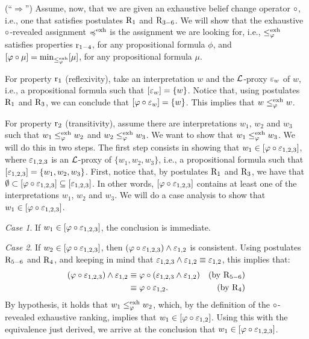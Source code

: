 \begin{prf*}{}{}
	(``$\Rightarrow$'')
	Assume, now, that we are given an exhaustive belief change operator $\circ$, 
	i.e., one that satisfies postulates $\mathrm{R}_{1}$ and $\mathrm{R}_{3-6}$.
	We will show that the exhaustive $\circ$-revealed assignment $\preccurlyeq^{\operatorname{exh}}$ 
	is the assignment we are looking for,
	i.e., $\le^{\operatorname{exh}}_\varphi$ satisfies properties $\mathrm{r}_{1-4}$, for any propositional formula $\phi$,
	and $[\varphi\circ\mu]={\operatorname{min}}_{\le^{\operatorname{exh}}_\varphi}[\mu]$, for any propositional formula $\mu$.
	
	For property $\mathrm{r}_{1}$ (reflexivity), take an interpretation $w$ and 
	the $\mathcal{L}$-proxy $\varepsilon_w$ of $w$, i.e., a propositional formula such that $[\varepsilon_w]=\{w\}$.
	Notice that, using postulates $\mathrm{R}_{1}$ and $\mathrm{R}_{3}$, we can conclude that 
	$[\varphi\circ\varepsilon_w]=\{w\}$. This implies that $w\le^{\operatorname{exh}}_\varphi w$.
	
	For property $\mathrm{r}_{2}$ (transitivity), assume there are interpretations $w_1$, $w_2$
	and $w_3$ such that $w_1\le^{\operatorname{exh}}_\varphi w_2$ and $w_2\le^{\operatorname{exh}}_\varphi w_3$. We want to show that $w_1\le^{\operatorname{exh}}_\varphi w_3$.
	We will do this in two steps. 
	The first step consists in showing that $w_1\in[\varphi\circ\varepsilon_{1,2,3}]$,
	where $\varepsilon_{1,2,3}$ is an $\mathcal{L}$-proxy of $\{w_1,w_2,w_3\}$,
	i.e., a propositional formula such that $[\varepsilon_{1,2,3}]=\{w_1,w_2,w_3\}$. 
	First, notice that, by postulates $\mathrm{R}_{1}$ and $\mathrm{R}_{3}$, we have that 
	$\emptyset\subset[\varphi\circ\varepsilon_{1,2,3}]\subseteq[\varepsilon_{1,2,3}]$.
	In other words, $[\varphi\circ\varepsilon_{1,2,3}]$ contains at least one of the interpretations $w_1$,
	$w_2$ and $w_3$. We will do a case analysis to show that $w_1\in[\varphi\circ\varepsilon_{1,2,3}]$.
	
	\emph{Case 1}. If $w_1\in[\varphi\circ\varepsilon_{1,2,3}]$, the conclusion is immediate.
	
	\emph{Case 2}. If $w_2\in[\varphi\circ\varepsilon_{1,2,3}]$, then $(\varphi\circ\varepsilon_{1,2,3})\land\varepsilon_{1,2}$ is consistent.
	Using postulates $\mathrm{R}_{5-6}$ and $\mathrm{R}_{4}$,
	and keeping in mind that $\varepsilon_{1,2,3}\land\varepsilon_{1,2}\equiv\varepsilon_{1,2}$,
	this implies that:
	\begin{align*}
		(\varphi\circ\varepsilon_{1,2,3})\land\varepsilon_{1,2} &\equiv\varphi\circ(\varepsilon_{1,2,3}\land\varepsilon_{1,2}) &(\text{by}~\mathrm{R}_{5-6})\\
		 										     &\equiv\varphi\circ\varepsilon_{1,2}. 		                 &(\text{by}~\mathrm{R}_{4})
	\end{align*}
	By hypothesis, it holds that $w_1\le^{\operatorname{exh}}_\varphi w_2$, which,
	by the definition of the $\circ$-revealed exhaustive ranking, 
	implies that $w_1\in[\varphi\circ\varepsilon_{1,2}]$.
	Using this with the equivalence just derived, we arrive at the conclusion that $w_1\in[\varphi\circ\varepsilon_{1,2,3}]$.
	

\end{prf*}
